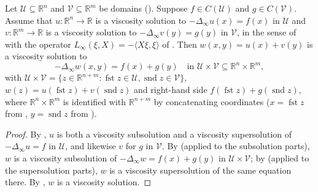 \begin{theorem}
Let $\mathcal U\subseteq\mathbb R^n$ and $\mathcal V\subseteq\mathbb R^m$ be domains (). Suppose $f\in C(\mathcal U)$ and $g\in C(\mathcal V)$. Assume that $u:\mathbb R^n\to\mathbb R$ is a viscosity solution to $-\Delta_\infty u(x)=f(x)$ in $\mathcal U$ and $v:\mathbb R^m\to\mathbb R$ is a viscosity solution to $-\Delta_\infty v(y)=g(y)$ in $\mathcal V$, in the sense of  with the operator $L_\infty(\xi,X)=-\langle X\xi,\xi\rangle$ of . Then $w(x,y)=u(x)+v(y)$ is a viscosity solution to
\[
-\Delta_\infty w(x,y)=f(x)+g(y)\quad\text{in }\mathcal U\times\mathcal V\subseteq\mathbb R^n\times\mathbb R^m ,
\]
with $\mathcal U\times\mathcal V=\{z\in\mathbb R^{n+m}:\operatorname{fst}z\in\mathcal U,\operatorname{snd}z\in\mathcal V\}$, $w(z)=u(\operatorname{fst}z)+v(\operatorname{snd}z)$ and right-hand side $f(\operatorname{fst}z)+g(\operatorname{snd}z)$, where $\mathbb R^n\times\mathbb R^m$ is identified with $\mathbb R^{n+m}$ by concatenating coordinates ($x=\operatorname{fst}z$ from , $y=\operatorname{snd}z$ from ).
\end{theorem}
\begin{proof}
By , $u$ is both a viscosity subsolution and a viscosity supersolution of $-\Delta_\infty u=f$ in $\mathcal U$, and likewise $v$ for $g$ in $\mathcal V$. By  (applied to the subsolution parts), $w$ is a viscosity subsolution of $-\Delta_\infty w=f(x)+g(y)$ in $\mathcal U\times\mathcal V$; by  (applied to the supersolution parts), $w$ is a viscosity supersolution of the same equation there. By , $w$ is a viscosity solution.
\end{proof}
